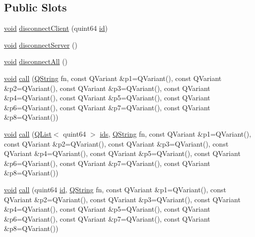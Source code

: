 \subsection*{Public Slots}
\begin{DoxyCompactItemize}
\item 
\hyperlink{group___u_a_v_objects_plugin_ga444cf2ff3f0ecbe028adce838d373f5c}{void} \hyperlink{class_qxt_r_p_c_service_a1c97516152b02be1a303e38bb2fa22da}{disconnect\-Client} (quint64 \hyperlink{glext_8h_a58c2a664503e14ffb8f21012aabff3e9}{id})
\item 
\hyperlink{group___u_a_v_objects_plugin_ga444cf2ff3f0ecbe028adce838d373f5c}{void} \hyperlink{class_qxt_r_p_c_service_aa7aaebcdc571455f9a04abce87ca79d1}{disconnect\-Server} ()
\item 
\hyperlink{group___u_a_v_objects_plugin_ga444cf2ff3f0ecbe028adce838d373f5c}{void} \hyperlink{class_qxt_r_p_c_service_a931a2118af9363ec236dcfa49483681f}{disconnect\-All} ()
\item 
\hyperlink{group___u_a_v_objects_plugin_ga444cf2ff3f0ecbe028adce838d373f5c}{void} \hyperlink{class_qxt_r_p_c_service_a5a0cb803d5f0dbadc102cc33cef612a3}{call} (\hyperlink{group___u_a_v_objects_plugin_gab9d252f49c333c94a72f97ce3105a32d}{Q\-String} fn, const Q\-Variant \&p1=Q\-Variant(), const Q\-Variant \&p2=Q\-Variant(), const Q\-Variant \&p3=Q\-Variant(), const Q\-Variant \&p4=Q\-Variant(), const Q\-Variant \&p5=Q\-Variant(), const Q\-Variant \&p6=Q\-Variant(), const Q\-Variant \&p7=Q\-Variant(), const Q\-Variant \&p8=Q\-Variant())
\item 
\hyperlink{group___u_a_v_objects_plugin_ga444cf2ff3f0ecbe028adce838d373f5c}{void} \hyperlink{class_qxt_r_p_c_service_af63e5956c301b51e9007baf0ed8c6b51}{call} (\hyperlink{class_q_list}{Q\-List}$<$ quint64 $>$ \hyperlink{glext_8h_a9d87e17a2e32dd2a7b881c7b1ca24a98}{ids}, \hyperlink{group___u_a_v_objects_plugin_gab9d252f49c333c94a72f97ce3105a32d}{Q\-String} fn, const Q\-Variant \&p1=Q\-Variant(), const Q\-Variant \&p2=Q\-Variant(), const Q\-Variant \&p3=Q\-Variant(), const Q\-Variant \&p4=Q\-Variant(), const Q\-Variant \&p5=Q\-Variant(), const Q\-Variant \&p6=Q\-Variant(), const Q\-Variant \&p7=Q\-Variant(), const Q\-Variant \&p8=Q\-Variant())
\item 
\hyperlink{group___u_a_v_objects_plugin_ga444cf2ff3f0ecbe028adce838d373f5c}{void} \hyperlink{class_qxt_r_p_c_service_ab105ef15a085758e05d3dd9ab329ad29}{call} (quint64 \hyperlink{glext_8h_a58c2a664503e14ffb8f21012aabff3e9}{id}, \hyperlink{group___u_a_v_objects_plugin_gab9d252f49c333c94a72f97ce3105a32d}{Q\-String} fn, const Q\-Variant \&p1=Q\-Variant(), const Q\-Variant \&p2=Q\-Variant(), const Q\-Variant \&p3=Q\-Variant(), const Q\-Variant \&p4=Q\-Variant(), const Q\-Variant \&p5=Q\-Variant(), const Q\-Variant \&p6=Q\-Variant(), const Q\-Variant \&p7=Q\-Variant(), const Q\-Variant \&p8=Q\-Variant())

\end{DoxyCompactItemize}
